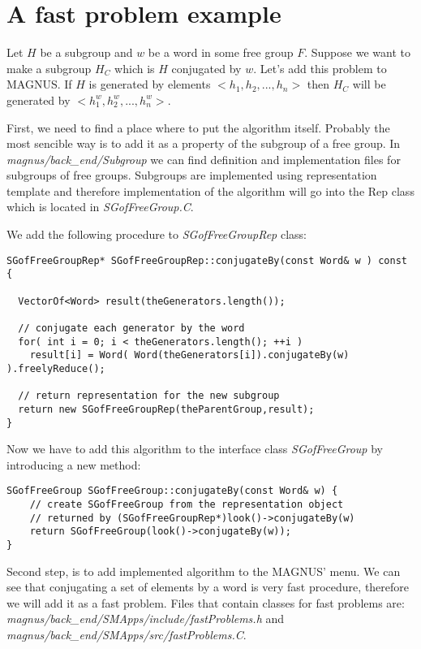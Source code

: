 \documentclass[12pt]{article}
\def\nsmagnus{MAGNUS}
\begin{document}
\appendix
\section{A fast problem example}
Let $H$ be a subgroup and $w$ be a word in some free group $F$.
Suppose we want to make a subgroup $H_C$ which is $H$ conjugated by $w$.
Let's add this problem to \nsmagnus. If $H$ is generated by elements
$<h_1, h_2, ..., h_n>$ then $H_C$ will be generated by $<h_1^w, h_2^w, ..., h_n^w>$.

First, we need to find a place where to put  the algorithm itself. 
Probably the most sencible way is to add it as a property of
the subgroup of a free group. In \emph{magnus/back\_end/Subgroup} we can find
definition and implementation files for subgroups of free groups.
Subgroups are implemented using representation template and therefore implementation
of the algorithm will go into the Rep class which is located in  \emph{SGofFreeGroup.C}.

We add the following procedure to \emph{SGofFreeGroupRep} class:

\footnotesize
\begin{verbatim}
SGofFreeGroupRep* SGofFreeGroupRep::conjugateBy(const Word& w ) const 
{
   
  VectorOf<Word> result(theGenerators.length());

  // conjugate each generator by the word
  for( int i = 0; i < theGenerators.length(); ++i ) 
    result[i] = Word( Word(theGenerators[i]).conjugateBy(w) ).freelyReduce();

  // return representation for the new subgroup
  return new SGofFreeGroupRep(theParentGroup,result);
}
\end{verbatim}
\normalsize

Now we have to add this algorithm to the interface class \emph{SGofFreeGroup}
by introducing a new method:
 
\footnotesize
\begin{verbatim}
SGofFreeGroup SGofFreeGroup::conjugateBy(const Word& w) {
    // create SGofFreeGroup from the representation object
    // returned by (SGofFreeGroupRep*)look()->conjugateBy(w)
    return SGofFreeGroup(look()->conjugateBy(w));
}
\end{verbatim}
\normalsize

Second step,  is to add implemented algorithm to the \nsmagnus' menu.
We can see that conjugating a set of elements by a word is very
fast procedure, therefore we will add it as a fast problem.
Files that contain classes for fast problems are:
\emph{magnus/back\_end/SMApps/include/fastProblems.h} and 
\emph{magnus/back\_end/SMApps/src/fastProblems.C}.
\end{document}
